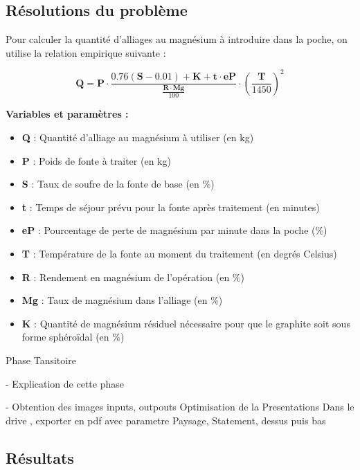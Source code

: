 \documentclass[12pt]{article}
\begin{document}
\subsection{Résolutions du problème}


Pour calculer la quantité d'alliages au magnésium à introduire dans la poche, on utilise la relation empirique suivante :

$$
\mathbf{Q} = \mathbf{P} \cdot \frac{0.76 (\mathbf{S} - 0.01) + \mathbf{K} + \mathbf{t} \cdot \mathbf{eP}}{\frac{\mathbf{R} \cdot \mathbf{Mg}}{100}} \cdot \left(\frac{\mathbf{T}}{1450}\right)^2
$$

\textbf{Variables et paramètres :}

\begin{itemize}
    \item \textbf{Q} : Quantité d'alliage au magnésium à utiliser (en kg)
    \item \textbf{P} : Poids de fonte à traiter (en kg)
    \item \textbf{S} : Taux de soufre de la fonte de base (en \%)
    \item \textbf{t} : Temps de séjour prévu pour la fonte après traitement (en minutes)
    \item \textbf{eP} : Pourcentage de perte de magnésium par minute dans la poche (\%)
    \item \textbf{T} : Température de la fonte au moment du traitement (en degrés Celsius)
    \item \textbf{R} : Rendement en magnésium de l'opération (en \%)
    \item \textbf{Mg} : Taux de magnésium dans l'alliage (en \%)
    \item \textbf{K} : Quantité de magnésium résiduel nécessaire pour que le graphite soit sous forme sphéroïdal (en \%)
\end{itemize}






Phase Tansitoire 

- Explication de cette phase 


- Obtention des images inputs, outpouts Optimisation de la Presentations
Dans le drive , exporter en pdf avec parametre Paysage, Statement, dessus puis bas






\subsection{Résultats}
    
\end{document}
